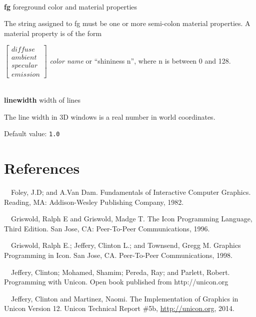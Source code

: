 \documentclass[letterpaper]{article}
\begin{document}
\bigskip

\noindent\hrulefill\\
\noindent\textsf{\textbf{fg}} \hfill foreground color and material properties


\bigskip

The string assigned to fg must be one or more semi-colon
material properties. A material property is of the form

$\left[
\begin{array}{l}
diffuse\\ambient\\specular\\emission
\end{array}
\right]$ \textsf{\textit{color name}} or \textsf{``shininess n''},
where \textsf{n} is between \textsf{0} and \textsf{128}.


\noindent\hrulefill\\
\noindent\textsf{\textbf{linewidth}} \hfill width of lines

\bigskip

\noindent
The line width in 3D windows is a real number in world coordinates.

\bigskip

\noindent
Default value: \texttt{1.0}


\section[References]{References}


\noindent
[Foley82]\ \ Foley, J.D; and A.Van Dam.
Fundamentals of Interactive Computer Graphics. Reading, MA: Addison-Wesley
Publishing Company, 1982.


\bigskip

\noindent
[Griswold96] \ \ Griswold, Ralph E and Griswold, Madge T.
The Icon Programming Language, Third Edition. San Jose, CA:
Peer-To-Peer Communications, 1996.

\bigskip

\noindent
[Griswold98]\ \ Griswold, Ralph E.; Jeffery, Clinton L.; and Townsend, Gregg M.
Graphics Programming in Icon. San Jose, CA.
Peer-To-Peer Communications, 1998.

\bigskip

\noindent
[Jeffery03]\ \ Jeffery, Clinton; Mohamed, Shamim; Pereda, Ray; and
Parlett, Robert. Programming with Unicon. Open book published from
http://unicon.org


\bigskip

\noindent
[JeffMart14]\ \ Jeffery, Clinton and Martinez, Naomi.
The Implementation of Graphics in Unicon Version 12. Unicon
Technical Report \#5b, \href{http://unicon.org/}{http://unicon.org}, 2014.
\end{document}
